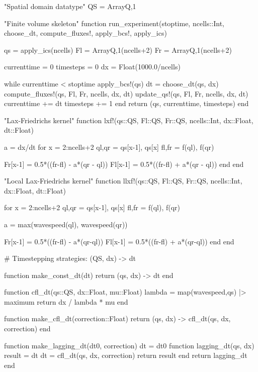 \begin{myjulia}
"Spatial domain datatype"
QS = Array{Q,1}

"Finite volume skeleton"
function run_experiment(stoptime, ncells::Int, 
    choose_dt, compute_fluxes!, apply_bcs!, apply_ics)

    qs = apply_ics(ncells)
    Fl = Array{Q,1}(ncells+2)
    Fr = Array{Q,1}(ncells+2)

    currenttime = 0
    timesteps = 0
    dx = Float(1000.0/ncells)
    
    while currenttime < stoptime
        apply_bcs!(qs)
        dt = choose_dt(qs, dx)
        compute_fluxes!(qs, Fl, Fr, ncells, dx, dt)
        update_qs!(qs, Fl, Fr, ncells, dx, dt)
        currenttime += dt
        timesteps += 1
    end
    return (qs, currenttime, timesteps)
end

\end{myjulia}
\begin{myjulia}

"Lax-Friedrichs kernel"
function lxf!(qs::QS, Fl::QS, Fr::QS, 
              ncells::Int, dx::Float, dt::Float)
    
    a = dx/dt
    for x = 2:ncells+2
        ql,qr = qs[x-1], qs[x]
        fl,fr = f(ql), f(qr)        

        Fr[x-1] = 0.5*((fr-fl) - a*(qr - ql))
        Fl[x-1] = 0.5*((fr-fl) + a*(qr - ql))
    end
end

\end{myjulia}
\newpage
\begin{myjulia}

"Local Lax-Friedrichs kernel"
function llxf!(qs::QS, Fl::QS, Fr::QS, 
               ncells::Int, dx::Float, dt::Float)
    
    for x = 2:ncells+2
        ql,qr = qs[x-1], qs[x]
        fl,fr = f(ql), f(qr)

        a = max(wavespeed(ql), wavespeed(qr))

        Fr[x-1] = 0.5*((fr-fl) - a*(qr-ql))
        Fl[x-1] = 0.5*((fr-fl) + a*(qr-ql))
    end
end
\end{myjulia}
\begin{myjulia}
# Timestepping strategies: (QS, dx) -> dt

function make_const_dt(dt)
    return (qs, dx) -> dt
end

function cfl_dt(qs::QS, dx::Float, mu::Float)
    lambda = map(wavespeed,qs) |> maximum
    return dx / lambda * mu
end

function make_cfl_dt(correction::Float)
    return (qs, dx) -> cfl_dt(qs, dx, correction)
end

function make_lagging_dt(dt0, correction)
    dt = dt0
    function lagging_dt(qs, dx)
        result = dt
        dt = cfl_dt(qs, dx, correction)
        return result
    end
    return lagging_dt
end
\end{myjulia}

